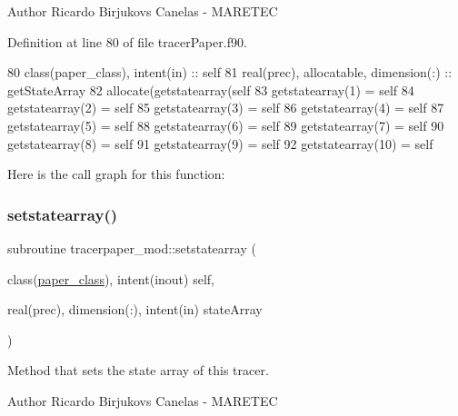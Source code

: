 \begin{DoxyAuthor}{Author}
Ricardo Birjukovs Canelas -\/ M\+A\+R\+E\+T\+EC 
\end{DoxyAuthor}


Definition at line 80 of file tracer\+Paper.\+f90.


\begin{DoxyCode}
80     \textcolor{keywordtype}{class}(paper\_class), \textcolor{keywordtype}{intent(in)} :: self
81     \textcolor{keywordtype}{real(prec)}, \textcolor{keywordtype}{allocatable}, \textcolor{keywordtype}{dimension(:)} :: getStateArray
82     \textcolor{keyword}{allocate}(getstatearray(self%
83     getstatearray(1) = self%
84     getstatearray(2) = self%
85     getstatearray(3) = self%
86     getstatearray(4) = self%
87     getstatearray(5) = self%
88     getstatearray(6) = self%
89     getstatearray(7) = self%
90     getstatearray(8) = self%
91     getstatearray(9) = self%
92     getstatearray(10) = self%
\end{DoxyCode}
Here is the call graph for this function\+:
\mbox{\label{namespacetracerpaper__mod_abda951b1d3a953fc25f24ee3ce8e2025}} 
\subsubsection{\texorpdfstring{setstatearray()}{setstatearray()}}
{\footnotesize\ttfamily subroutine tracerpaper\+\_\+mod\+::setstatearray (\begin{DoxyParamCaption}\item[{class(\mbox{\hyperlink{structtracerpaper__mod_1_1paper__class}{paper\+\_\+class}}), intent(inout)}]{self,  }\item[{real(prec), dimension(\+:), intent(in)}]{state\+Array }\end{DoxyParamCaption})\hspace{0.3cm}{\ttfamily [private]}}



Method that sets the state array of this tracer. 

\begin{DoxyAuthor}{Author}
Ricardo Birjukovs Canelas -\/ M\+A\+R\+E\+T\+EC 
\end{DoxyAuthor}



